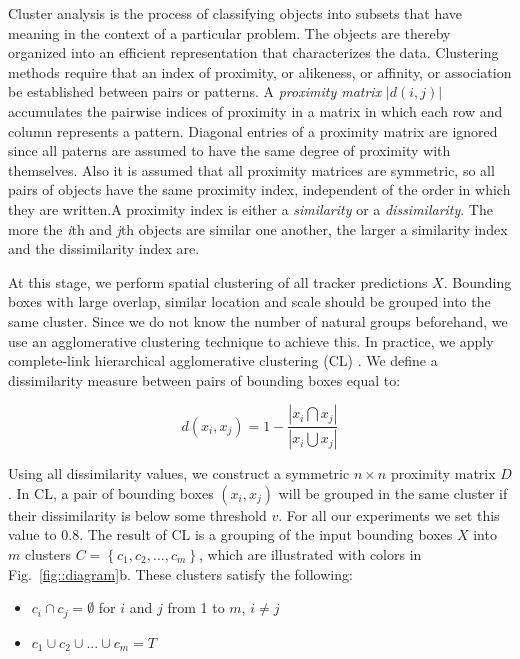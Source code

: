 Cluster analysis is the process of classifying objects into subsets that have
meaning in the context of a particular problem. The objects are thereby
organized into an efficient representation that characterizes the data.
Clustering methods require that an index of proximity, or alikeness, or
affinity, or association be established between pairs or patterns. A
\textit{proximity matrix} $|d(i, j)|$ accumulates the pairwise indices of
proximity in a matrix in which each row and column represents a pattern.
Diagonal entries of a proximity matrix are ignored since all paterns are
assumed to have the same degree of proximity with themselves. Also it is
assumed that all proximity matrices are symmetric, so all pairs of objects have
the same proximity index, independent of the order in which they are written.A
proximity index is either a \textit{similarity} or a \textit{dissimilarity}.
The more the \textit{i}th and \textit{j}th objects are similar one another, the
larger a similarity index and the dissimilarity index are.

At this stage, we perform spatial clustering of all tracker predictions $X$.
Bounding boxes with large overlap, similar location and scale should be grouped
into the same cluster.
Since we do not know the number of natural groups beforehand, we use
an agglomerative clustering technique to achieve this. In practice,
we apply complete-link hierarchical agglomerative clustering (CL)
\cite{Jain88}.
We define a dissimilarity measure between pairs of bounding boxes equal to:

\begin{equation}
d(x_i,x_j) = 1 - \frac{|x_i \bigcap x_j|}{|x_i \bigcup  x_j|}
\label{eq::diff}
\end{equation}

Using all dissimilarity values, we construct a symmetric $n \times n$ proximity
matrix $D$. In CL, a pair of bounding boxes $(x_i, x_j)$ will be grouped in
the same cluster if their dissimilarity is below some threshold $v$.
For all our experiments we set this value to $0.8$.
The result of CL is a grouping of the input bounding boxes $X$ into 
$m$ clusters $C = \left \{ c_1, c_2, ..., c_m \right \}$,
which are illustrated with colors in Fig.~\ref{fig::diagram}b. These clusters
satisfy the following:
\begin{itemize}
\item $c_i \cap c_j = \emptyset$ for $i$ and $j$ from 1 to $m$, $i \neq j$
\item $c_1 \cup c_2 \cup ... \cup c_m = T$
\end{itemize}

